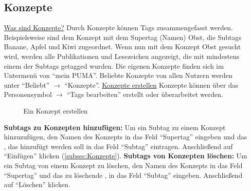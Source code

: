 \subsection{Konzepte}
\underline{Was sind Konzepte?\label{subsec:Konzepte}}
\newline
Durch Konzepte können Tags zusammengefasst werden. Beispielsweise sind dem Konzept mit dem Supertag (Namen) Obst, die Subtags Banane, Apfel und Kiwi zugeordnet. Wenn nun mit dem Konzept Obst gesucht wird, werden alle Publikationen und Lesezeichen angezeigt, die mit mindestens einem der Subtags getagged wurden. 
\newline Die eigenen Konzepte finden sich im Untermenü von \enquote{mein PUMA}. Beliebte Konzepte von allen Nutzern werden unter \enquote{Beliebt} $\to$ \enquote{Konzepte}. 
\newline
\newline
\underline{Konzepte erstellen}
\newline
Konzepte können über das Personensymbol $\to$ \enquote{Tags bearbeiten} erstellt oder überarbeitet werden.
\begin{figure}[h!]
 \centering
 \caption{Ein Konzept erstellen}
 \label{figure027}
\end{figure}
\textbf{Subtags zu Konzepten hinzufügen:}
Um ein Subtag zu einem Konzept hinzuzufügen, den Namen des Konzepts in das Feld \enquote{Supertag} eingeben und das \tag, das hinzufügt werden soll in das Feld \enquote{Subtag} eintragen. Anschließend auf \enquote{Einfügen} klicken (\autoref{subsec:Konzepte}).
\textbf{Subtags von Konzepten löschen:} Um ein Subtag von einem Konzept zu löschen, den Namen des Konzepts in das Feld \enquote{Supertag} und das zu löschende \tag, in das Feld \enquote{Subtag} eingeben. Anschließend auf \enquote{Löschen} klicken.

